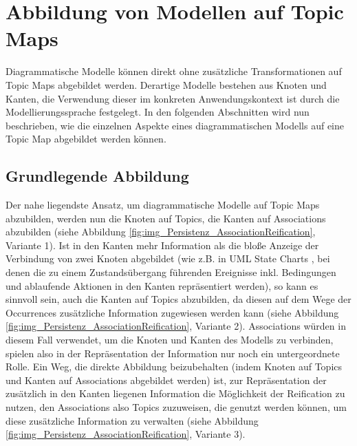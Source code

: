 
\section{Abbildung von Modellen auf Topic Maps} %
\label{sec:abbildung_von_modellen_auf_topic_maps}

Diagrammatische Modelle \citep[siehe etwa][]{Oppl05a} können direkt ohne zusätzliche Transformationen auf Topic Maps abgebildet werden. Derartige Modelle bestehen aus Knoten und Kanten, die Verwendung dieser im konkreten Anwendungskontext ist durch die Modellierungssprache festgelegt. In den folgenden Abschnitten wird nun beschrieben, wie die einzelnen Aspekte eines diagrammatischen Modells auf eine Topic Map abgebildet werden können.

\subsection{Grundlegende Abbildung} %
\label{sub:grundlegende_abbildung}
Der nahe liegendste Ansatz, um diagrammatische Modelle auf Topic Maps abzubilden, werden nun die Knoten auf Topics, die Kanten auf Associations abzubilden (siehe Abbildung \ref{fig:img_Persistenz_AssociationReification}, Variante 1). Ist in den Kanten mehr Information als die bloße Anzeige der Verbindung von zwei Knoten abgebildet (wie z.B. in \gls{UML} State Charts \citep{Rumbaugh04}, bei denen die zu einem Zustandsübergang führenden Ereignisse inkl. Bedingungen und ablaufende Aktionen in den Kanten repräsentiert werden), so kann es sinnvoll sein, auch die Kanten auf Topics abzubilden, da diesen auf dem Wege der Occurrences zusätzliche Information zugewiesen werden kann (siehe Abbildung \ref{fig:img_Persistenz_AssociationReification}, Variante 2). Associations würden in diesem Fall verwendet, um die Knoten und Kanten des Modells zu verbinden, spielen also in der Repräsentation der Information nur noch ein untergeordnete Rolle. Ein Weg, die direkte Abbildung beizubehalten (indem Knoten auf Topics und Kanten auf Associations abgebildet werden) ist, zur Repräsentation der zusätzlich in den Kanten liegenen Information die Möglichkeit der Reification zu nutzen, den Associations also Topics zuzuweisen, die genutzt werden können, um diese zusätzliche Information zu verwalten (siehe Abbildung \ref{fig:img_Persistenz_AssociationReification}, Variante 3).

